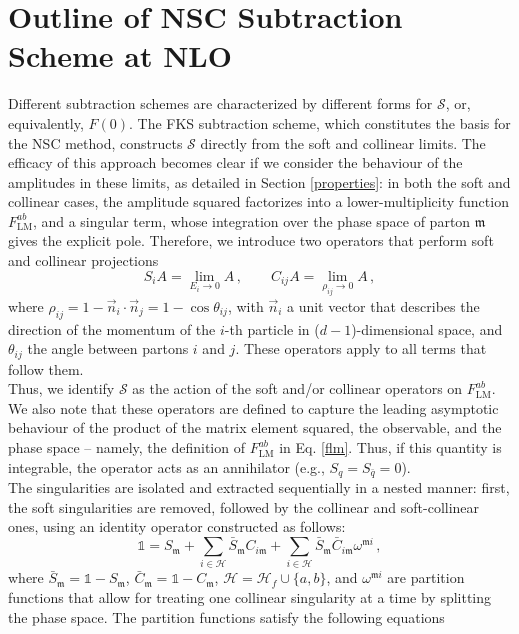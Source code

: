 \documentclass[a4paper, 12pt]{book}
\newcommand{\um}{\mathfrak{m}}
\begin{document}
\section{Outline of NSC Subtraction Scheme at NLO}
Different subtraction schemes are characterized by different forms for $\mathcal{S}$, or, equivalently, $F(0)$. The FKS subtraction scheme, which constitutes the basis for the NSC method, constructs $\mathcal{S}$ directly from the soft and collinear limits. The efficacy of this approach becomes clear if we consider the behaviour of the amplitudes in these limits, as detailed in Section \ref{properties}: in both the soft and collinear cases, the amplitude squared factorizes into a  lower-multiplicity function $F^{ab}_{\mathrm{LM}}$, and a singular term, whose integration over the phase space of parton $\um$ gives the explicit pole. Therefore, we introduce two operators that perform soft and collinear projections
\begin{equation}
    S_i A = \lim_{E_i \to 0} A \, , \qquad C_{ij}A = \lim_{\rho_{ij}\to 0}A \, ,
    \label{projections}
\end{equation}
where $\rho_{ij}= 1 - \vec{n}_i \cdot \vec{n}_j = 1 - \cos{\theta_{ij}}$, with $\vec{n}_i$ a unit vector that describes the direction of the momentum of the $i$-th particle in ($d-1$)-dimensional space, and $\theta_{ij}$ the angle between partons $i$ and $j$. These operators apply to all terms that follow them. \\
Thus, we identify $\mathcal{S}$ as the action of the soft and/or collinear operators on $F^{ab}_{\mathrm{LM}}$. We also note that these operators are defined to capture the leading asymptotic behaviour of the product of the matrix element squared, the observable, and the phase space – namely, the definition of $F^{ab}_{\mathrm{LM}}$ in Eq. \ref{flm}. Thus, if this quantity is integrable, the operator acts as an annihilator (e.g., $S_q = S_{\bar{q}}=0$). \\
The singularities are isolated and extracted sequentially in a nested manner: first, the soft singularities are removed, followed by the collinear and soft-collinear ones, using an identity operator constructed as follows:
\begin{equation}
    \mathbb{1} = S_\um + \sum_{i \in \mathcal{H}} \bar{ S}_\um C_{i\um} + \sum_{i \in \mathcal{H}} \bar{S}_\um \bar{C}_{i \um} \omega^{\um i} \, ,
    \label{identity-soft-coll}
\end{equation}
where $\bar{ S}_\um= \mathbb{1} - S_\um$, $\bar{ C}_\um= \mathbb{1} - C_\um$, $\mathcal{H} = \mathcal{H}_f \cup \{a,b\}$, and $\omega^{\um i}$ are partition functions that  allow for treating one collinear singularity at a time by splitting the phase space. The partition functions satisfy the following equations
\end{document}
